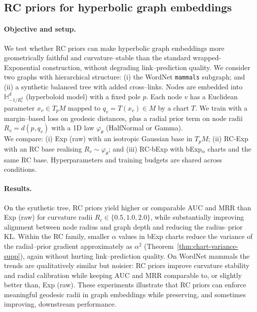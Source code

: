 \documentclass{article}
\theoremstyle{definition}
\theoremstyle{remark}
\newcommand{\HH}{\mathbb{H}}
\begin{document}
\subsection*{RC priors for hyperbolic graph embeddings}
\label{app:E_graph_embeddings}

\paragraph{Objective and setup.}
We test whether RC priors can make hyperbolic graph embeddings more geometrically faithful
and curvature--stable than the standard wrapped-Exponential construction, without degrading
link--prediction quality.
We consider two graphs with hierarchical structure:
(i) the WordNet \texttt{mammals} subgraph; and
(ii) a synthetic balanced tree with added cross--links.
Nodes are embedded into $\HH^d_{-1/R_c^2}$ (hyperboloid model) with a fixed pole $p$.
Each node $v$ has a Euclidean parameter $x_v \in T_pM$ mapped to
$q_v = T(x_v) \in M$ by a chart $T$.
We train with a margin--based loss on geodesic distances, plus a radial prior term on node
radii $R_v = d(p,q_v)$ with a 1D law $\varphi_\theta$ (HalfNormal or Gamma).\\

We compare:
(i) Exp (raw) with an isotropic Gaussian base in $T_pM$;
(ii) RC-Exp with an RC base realising $R_v \sim \varphi_\theta$; and
(iii) RC-bExp with bExp$_\alpha$ charts and the same RC base.
Hyperparameters and training budgets are shared across conditions.

\paragraph{Results.}
On the synthetic tree, RC priors yield higher or comparable AUC and MRR than Exp (raw) for
curvature radii $R_c \in \{0.5,1.0,2.0\}$, while substantially improving alignment between node
radius and graph depth and reducing the radius--prior KL.
Within the RC family, smaller $\alpha$ values in bExp charts reduce the variance of the
radial--prior gradient approximately as $\alpha^2$ (Theorem~\ref{thm:chart-variance-supp}), again without
hurting link--prediction quality.
On WordNet mammals the trends are qualitatively similar but noisier:
RC priors improve curvature stability and radial calibration while keeping AUC and MRR
comparable to, or slightly better than, Exp (raw).
These experiments illustrate that RC priors can enforce meaningful geodesic radii in graph
embeddings while preserving, and sometimes improving, downstream performance.
\end{document}
